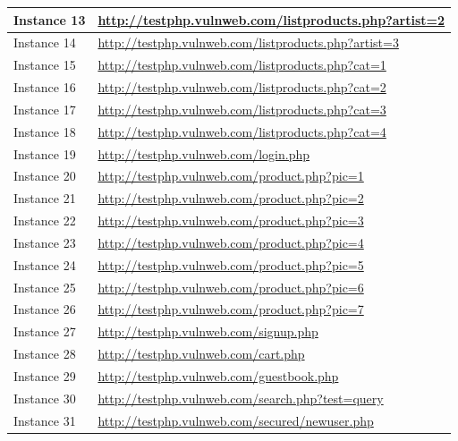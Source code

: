 \documentclass[12pt]{article}
\begin{document}
\begin{center}
\begin{longtable}{|l|p{10cm}|}
\hline
Instance 13 & \url{http://testphp.vulnweb.com/listproducts.php?artist=2} \\
\hline
Instance 14 & \url{http://testphp.vulnweb.com/listproducts.php?artist=3} \\
\hline
Instance 15 & \url{http://testphp.vulnweb.com/listproducts.php?cat=1} \\
\hline
Instance 16 & \url{http://testphp.vulnweb.com/listproducts.php?cat=2} \\
\hline
Instance 17 & \url{http://testphp.vulnweb.com/listproducts.php?cat=3} \\
\hline
Instance 18 & \url{http://testphp.vulnweb.com/listproducts.php?cat=4} \\
\hline
Instance 19 & \url{http://testphp.vulnweb.com/login.php} \\
\hline
Instance 20 & \url{http://testphp.vulnweb.com/product.php?pic=1} \\
\hline
Instance 21 & \url{http://testphp.vulnweb.com/product.php?pic=2} \\
\hline
Instance 22 & \url{http://testphp.vulnweb.com/product.php?pic=3} \\
\hline
Instance 23 & \url{http://testphp.vulnweb.com/product.php?pic=4} \\
\hline
Instance 24 & \url{http://testphp.vulnweb.com/product.php?pic=5} \\
\hline
Instance 25 & \url{http://testphp.vulnweb.com/product.php?pic=6} \\
\hline
Instance 26 & \url{http://testphp.vulnweb.com/product.php?pic=7} \\
\hline
Instance 27 & \url{http://testphp.vulnweb.com/signup.php} \\
\hline
Instance 28 & \url{http://testphp.vulnweb.com/cart.php} \\
\hline
Instance 29 & \url{http://testphp.vulnweb.com/guestbook.php} \\
\hline
Instance 30 & \url{http://testphp.vulnweb.com/search.php?test=query} \\
\hline
Instance 31 & \url{http://testphp.vulnweb.com/secured/newuser.php} \\
\hline
\end{longtable}
\end{center}\vspace{0.7cm}
\end{document}
